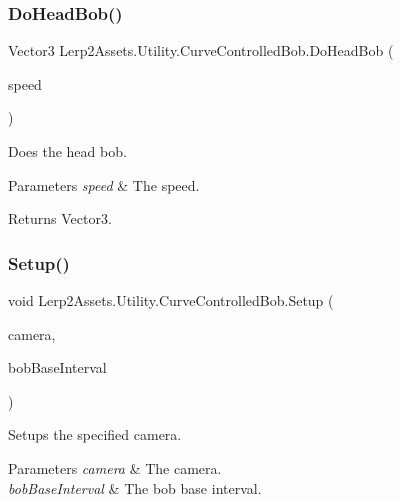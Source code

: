 \subsubsection{\texorpdfstring{Do\+Head\+Bob()}{DoHeadBob()}}
{\footnotesize\ttfamily Vector3 Lerp2\+Assets.\+Utility.\+Curve\+Controlled\+Bob.\+Do\+Head\+Bob (\begin{DoxyParamCaption}\item[{float}]{speed }\end{DoxyParamCaption})\hspace{0.3cm}{\ttfamily [inline]}}



Does the head bob. 


\begin{DoxyParams}{Parameters}
{\em speed} & The speed.\\
\hline
\end{DoxyParams}
\begin{DoxyReturn}{Returns}
Vector3.
\end{DoxyReturn}
\mbox{\label{class_lerp2_assets_1_1_utility_1_1_curve_controlled_bob_a8d8e6b44790dd78291c06239bc866ccc}} 
\subsubsection{\texorpdfstring{Setup()}{Setup()}}
{\footnotesize\ttfamily void Lerp2\+Assets.\+Utility.\+Curve\+Controlled\+Bob.\+Setup (\begin{DoxyParamCaption}\item[{Camera}]{camera,  }\item[{float}]{bob\+Base\+Interval }\end{DoxyParamCaption})\hspace{0.3cm}{\ttfamily [inline]}}



Setups the specified camera. 


\begin{DoxyParams}{Parameters}
{\em camera} & The camera.\\
\hline
{\em bob\+Base\+Interval} & The bob base interval.\\
\hline
\end{DoxyParams}


